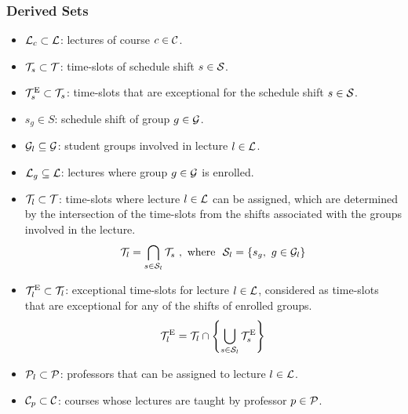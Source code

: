     \newcommand{\excepTimes}{\timeslots^\text{E}}
    
    \subsubsection{Derived Sets}    
        \begin{itemize}
            \item $\mathcal{L}_c \subset \mathcal{L}$: lectures of course $c\in\mathcal{C}$.
            \item $\mathcal{T}_s \subset \mathcal{T}$: time-slots of schedule shift $s\in\mathcal{S}$.
            \item $\excepTimes_s \subset \timeslots_s$: time-slots that are exceptional for the schedule shift $s\in\mathcal{S}$.
            \item $s_g \in S$: schedule shift of group $g\in\mathcal{G}$.
            \item $\mathcal{G}_l \subseteq \mathcal{G}$: student groups involved in lecture $l\in\mathcal{L}$.
            \item $\mathcal{L}_g \subseteq \mathcal{L}$: lectures where group $g\in\mathcal{G}$ is enrolled.
            \item $\mathcal{T}_l \subset \mathcal{T}$: time-slots where lecture $l\in\mathcal{L}$ can be assigned, which are determined by the intersection of the time-slots from the shifts associated with the groups involved in the lecture.
            \begin{equation}
                \mathcal{T}_l = \bigcap_{s\in\mathcal{S}_l} {\mathcal{T}_s} \ , \text{ where } \ \mathcal{S}_l =\{s_g, \ g\in\mathcal{G}_l\}
                \nonumber
            \end{equation}
            \item $\excepTimes_l \subset \timeslots_l$: exceptional time-slots for lecture $l\in\mathcal{L}$, considered as time-slots that are exceptional for any of the shifts of enrolled groups.
            \begin{equation}
                \excepTimes_l = \timeslots_l \cap \left\{ \bigcup_{s\in\shifts_l}{\excepTimes_s} \right\}
                \nonumber
            \end{equation}
            \item $\mathcal{P}_l\subset \mathcal{P}$: professors that can be assigned to lecture $l\in\mathcal{L}$.
            \item $\mathcal{C}_p \subset \mathcal{C}$: courses whose lectures are taught by professor $p\in\mathcal{P}$.

\end{itemize}
